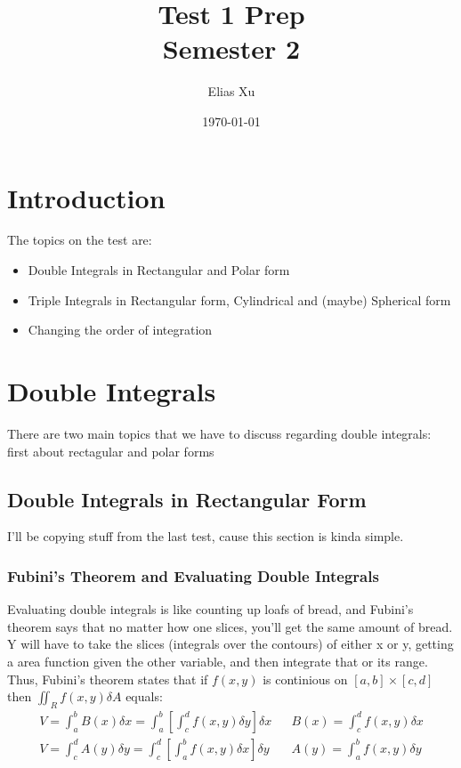 \documentclass{article}
\begin{document}
\title{Test 1 Prep \\
    \large{Semester 2}}
\author{Elias Xu}
\date{\today}
\maketitle

\tableofcontents

\setlength{\parindent}{0pt}

\section{Introduction}

The topics on the test are: 
\begin{itemize}
    \item Double Integrals in Rectangular and Polar form
    \item Triple Integrals in Rectangular form, Cylindrical and (maybe) Spherical form
    \item Changing the order of integration
\end{itemize}

\section{Double Integrals}

There are two main topics that we have to discuss regarding double integrals: first about rectagular and polar forms

\subsection{Double Integrals in Rectangular Form}

I'll be copying stuff from the last test, cause this section is kinda simple. 


\subsubsection{Fubini's Theorem and Evaluating Double Integrals}

Evaluating double integrals is like counting up loafs of bread, and Fubini's theorem says that no matter how one slices, you'll get the same amount of bread. Y will have to take the slices (integrals over the contours) of either x or y, getting a area function given the other variable, and then integrate that or its range. \\ 
Thus, Fubini's theorem states that if $f(x, y)$ is continious on $[a, b] \times [c, d]$ then $\iint_{R} f(x, y) \delta A$ equals:
\begin{align*}
    V = \int_{a}^{b} B(x) \delta x = \int_{a}^{b} \left[ \int_{c}^{d} f(x,y) \delta y \right] \delta x  &  & B(x) = \int_{c}^{d} f(x, y) \delta x \\
    V = \int_{c}^{d} A(y) \delta y = \int_{c}^{d} \left[ \int_{a}^{b} f(x, y) \delta x \right] \delta y &  & A(y) = \int_{a}^{b} f(x, y) \delta y
\end{align*}
\end{document}

